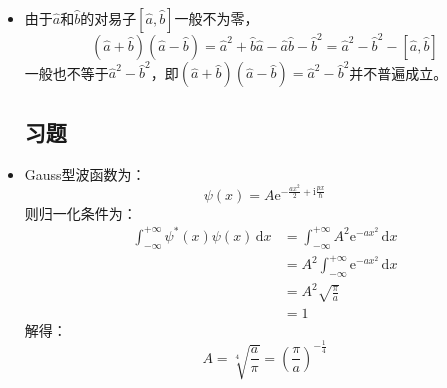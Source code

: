 \documentclass[a4paper,fontset=none]{ctexart}
\begin{document}
\begin{itemize}
        \item[1.24]
        由于$\hat{a}$和$\hat{b}$的对易子$[\hat{a},\hat{b}]$一般不为零，
        \[
        (\hat{a}+\hat{b})(\hat{a}-\hat{b}) = \hat{a}^2 + \hat{b}\hat{a} - \hat{a}\hat{b} - \hat{b}^2 = \hat{a}^2 - \hat{b}^2 - [\hat{a},\hat{b}]
        \]
        一般也不等于$\hat{a}^2 - \hat{b}^2$，即$(\hat{a}+\hat{b})(\hat{a}-\hat{b}) = \hat{a}^2 - \hat{b}^2$并不普遍成立。

        \subsection*{习题}

        \item[1.18]
        Gauss型波函数为：
        \[
        \psi(x) = A\mathrm{e}^{-\tfrac{ax^2}{2}+\mathrm{i}\tfrac{px}{\hbar}}
        \]
        则归一化条件为：
        \begin{align*}
            \int_{-\infty}^{+\infty}\psi^*(x)\psi(x)\,\mathrm{d}x
            &= \int_{-\infty}^{+\infty}A^2\mathrm{e}^{-ax^2}\,\mathrm{d}x \\
            &= A^2\int_{-\infty}^{+\infty}\mathrm{e}^{-ax^2}\,\mathrm{d}x \\
            &= A^2\sqrt{\frac{\pi}{a}} \\
            &= 1
        \end{align*}
        解得：
        \[
        A = \sqrt[4]{\frac{a}{\pi}} = \left(\frac{\pi}{a}\right)^{-\tfrac{1}{4}}
        \]


\end{itemize}
\end{document}
